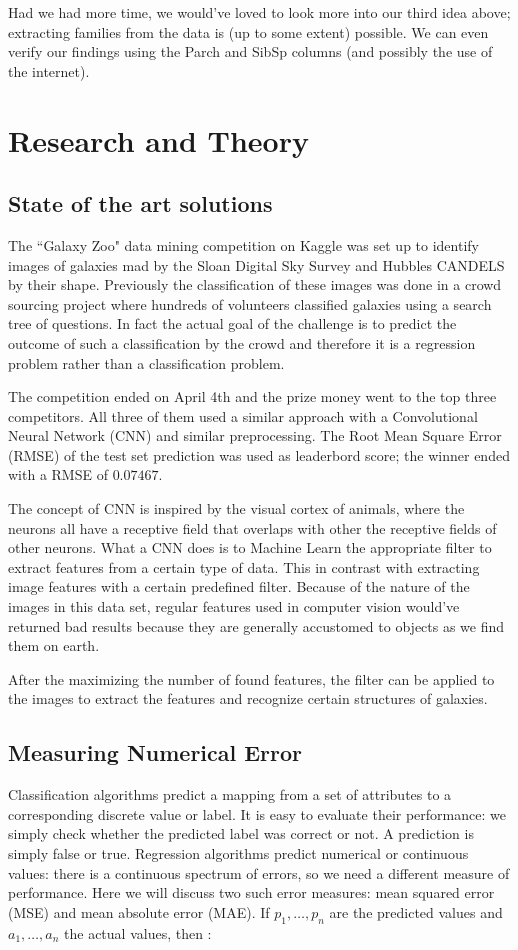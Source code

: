 \documentclass[runningheads,a4paper]{llncs}
\begin{document}
Had we had more time, we would've loved to look more into our third idea above; extracting families from the data is (up to some extent) possible.  We can even verify our findings using the Parch and SibSp columns (and possibly the use of the internet).

\section{Research and Theory}

\subsection{State of the art solutions}
The ``Galaxy Zoo" data mining competition on Kaggle \cite{kaggle:galaxy} was set up to identify images of galaxies mad by the Sloan Digital Sky Survey \cite{sdss} and Hubbles CANDELS \cite{candels} by their shape. Previously the classification of these images was done in a crowd sourcing project where hundreds of volunteers classified galaxies using a search tree of questions. In fact the actual goal of the challenge is to predict the outcome of such a classification by the crowd and therefore it is a regression problem rather than a classification problem.

The competition ended on April 4th and the prize money went to the top three competitors. All three of them used a similar approach with a Convolutional Neural Network (CNN) and similar preprocessing. The Root Mean Square Error (RMSE) of the test set prediction was used as leaderbord score; the winner ended with a RMSE of $0.07467$. 

The concept of CNN is inspired by the visual cortex of animals, where the neurons all have a receptive field that overlaps with other the receptive fields of other neurons.  What a CNN does is to Machine Learn the appropriate filter to extract features from a certain type of data. This in contrast with extracting image features with a certain predefined filter. Because of the nature of the images in this data set, regular features used in computer vision would've returned bad results because they are generally accustomed to objects as we find them on earth. 

After the maximizing the number of found features, the filter can be applied to the images to extract the features and recognize certain structures of galaxies. 

\subsection{Measuring Numerical Error}
Classification algorithms predict a mapping from a set of attributes to a corresponding discrete value or label. It is easy to evaluate their performance: we simply check whether the predicted label was correct or not. A prediction is simply false or true. Regression algorithms predict numerical or continuous values: there is a continuous spectrum of errors, so we need a different measure of performance. Here we will discuss two such error measures: mean squared error (MSE) and mean absolute error (MAE). If $p_1, \dots, p_n$ are the predicted values and $a_1, \dots, a_n$ the actual values, then \cite{witten}:
\end{document}
